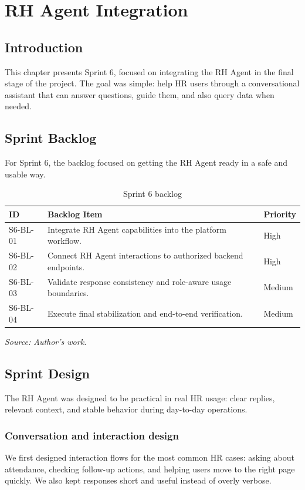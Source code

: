 \chapter{RH Agent Integration}
\minitoc
\clearpage
\section{Introduction}
This chapter presents Sprint 6, focused on integrating the RH Agent in the final stage of the project. The goal was simple: help HR users through a conversational assistant that can answer questions, guide them, and also query data when needed.

\section{Sprint Backlog}
For Sprint 6, the backlog focused on getting the RH Agent ready in a safe and usable way.
\begin{table}[H]
\centering
\renewcommand{\arraystretch}{1.2}
\begin{tabular}{|l|>{\raggedright\arraybackslash}p{10.2cm}|l|}
\hline
\textbf{ID} & \textbf{Backlog Item} & \textbf{Priority} \\
\hline
S6-BL-01 & Integrate RH Agent capabilities into the platform workflow. & High \\
\hline
S6-BL-02 & Connect RH Agent interactions to authorized backend endpoints. & High \\
\hline
S6-BL-03 & Validate response consistency and role-aware usage boundaries. & Medium \\
\hline
S6-BL-04 & Execute final stabilization and end-to-end verification. & Medium \\
\hline
\end{tabular}
\caption{Sprint 6 backlog}
\label{tab:sprint-6-backlog}
{\footnotesize\textit{Source: Author's work.}}
\end{table}

\section{Sprint Design}
The RH Agent was designed to be practical in real HR usage: clear replies, relevant context, and stable behavior during day-to-day operations.

\subsection{Conversation and interaction design}
We first designed interaction flows for the most common HR cases: asking about attendance, checking follow-up actions, and helping users move to the right page quickly. We also kept responses short and useful instead of overly verbose.

